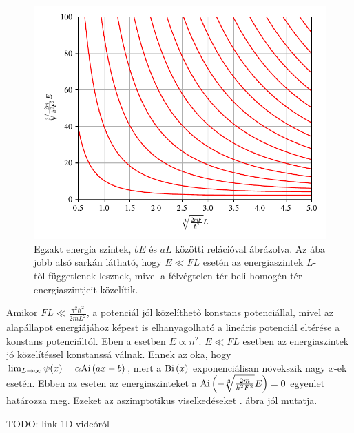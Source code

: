 	\begin{figure}[H]
		\includegraphics[scale=1]{./figs/energiaszintek.pdf}
		\caption[Egzakt energiaszintek]{Egzakt energia szintek, $bE$ és $aL$ közötti relációval ábrázolva. Az ába jobb alsó sarkán látható, hogy $E \ll FL$ esetén az energiaszintek $L$-től függetlenek lesznek, mivel a félvégtelen tér beli homogén tér energiaszintjeit közelítik.}
		\label{box_energiaszintek_abra}
	\end{figure}
	Amikor $FL \ll \frac{\pi^2\hbar^2}{2mL^2}$, a potenciál jól közelíthető konstans potenciállal, mivel az alapállapot energiájához képest is elhanyagolható a lineáris potenciál eltérése a konstans potenciáltól. Eben a esetben $E \propto n^2$. $E \ll FL$ esetben az energiaszintek jó közelítéssel konstanssá válnak. Ennek az oka, hogy $\lim_{L \to \infty}\psi(x) = \alpha \mathrm{Ai}\left(ax-b\right)$, mert a $\mathrm{Bi}\left(x\right)$ exponenciálisan növekszik nagy $x$-ek esetén. Ebben az eseten az energiaszinteket a $\mathrm{Ai}\left(- \sqrt[3]{\frac{2m}{\hbar^2F^2}}E\right) = 0$ egyenlet határozza meg. Ezeket az aszimptotikus viselkedéseket . ábra jól mutatja.
    
    TODO: link 1D videóról

